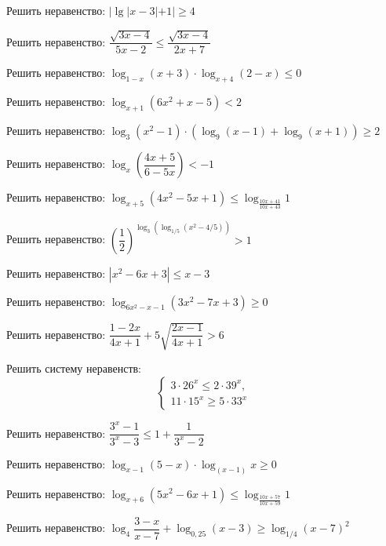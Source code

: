 \begin{class}[number=2]
	\begin{listofex}
		\item Решить неравенство: 
		\( |\lg|x-3|+1|\ge4 \)
		\item Решить неравенство: 
		\( \dfrac{\sqrt{3x-4}}{5x-2}\le\dfrac{\sqrt{3x-4}}{2x+7} \)
		\item Решить неравенство: 
		\( \log_{1-x}(x+3)\cdot\log_{x+4}(2-x)\le0 \)
		\item Решить неравенство: 
		\( \log_{x+1}(6x^2+x-5)<2 \)
		\item Решить неравенство: 
		\( \log_3(x^2-1)\cdot(\log_9(x-1)+\log_9(x+1))\ge2 \)
		\item Решить неравенство: 
		\( \log_x \left( \dfrac{4x+5}{6-5x} \right)< -1 \)
		\item Решить неравенство: 
		\( \log_{x+5}(4x^2-5x+1)\le\log_{\frac{10x+41}{10x+43}}1 \)
		\item Решить неравенство: 
		\( \left( \dfrac{1}{2} \right)^{\log_3(\log_{1/5}(x^2-4/5))}>1 \)
	\end{listofex}
\end{class}

\begin{homework}[number=1]
	\begin{listofex}
		\item Решить неравенство: 
		\( |x^2-6x+3|\le x-3 \)
		\item Решить неравенство: 
		\( \log_{6x^2-x-1}(3x^2-7x+3)\ge0 \)
		\item Решить неравенство: 
		\( \dfrac{1-2x}{4x+1}+5\sqrt{\dfrac{2x-1}{4x+1}}>6 \)
		\item Решить систему неравенств: 
		\[ \left\{
		\begin{array}{l}
			3\cdot26^x\le2\cdot39^x, \\
			11\cdot15^x\ge5\cdot33^x
		\end{array}
		\right. \]
		\item Решить неравенство: 
		\( \dfrac{3^x-1}{3^x-3}\le1+\dfrac{1}{3^x-2} \)
		\item Решить неравенство: 
		\( \log_{x-1}(5-x)\cdot\log_(x-1)x\ge0 \)
		\item Решить неравенство: 
		\( \log_{x+6}(5x^2-6x+1)\le\log_{\frac{10x+57}{10x+59}}1 \)
		\item Решить неравенство: 
		\( \log_4\dfrac{3-x}{x-7}+\log_{0,25}(x-3)\ge\log_{1/4}(x-7)^2 \)
	\end{listofex}
\end{homework}

